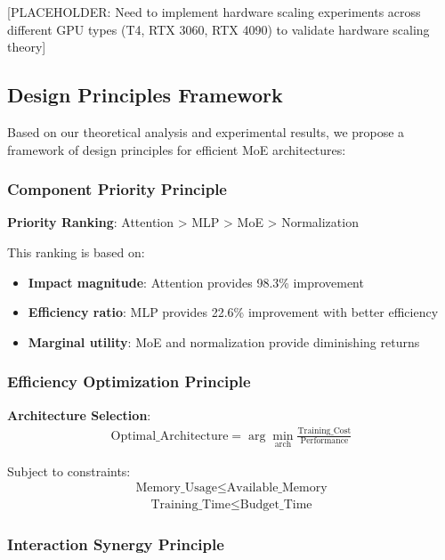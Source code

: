 \documentclass[11pt,a4paper]{article}
\begin{document}
[PLACEHOLDER: Need to implement hardware scaling experiments across different GPU types (T4, RTX 3060, RTX 4090) to validate hardware scaling theory]

\subsection{Design Principles Framework}

Based on our theoretical analysis and experimental results, we propose a framework of design principles for efficient MoE architectures:

\subsubsection{Component Priority Principle}

\textbf{Priority Ranking}: Attention > MLP > MoE > Normalization

This ranking is based on:
\begin{itemize}
    \item \textbf{Impact magnitude}: Attention provides 98.3\% improvement
    \item \textbf{Efficiency ratio}: MLP provides 22.6\% improvement with better efficiency
    \item \textbf{Marginal utility}: MoE and normalization provide diminishing returns
\end{itemize}

\subsubsection{Efficiency Optimization Principle}

\textbf{Architecture Selection}:
\begin{align}
\text{Optimal\_Architecture} = \arg\min_{\text{arch}} \frac{\text{Training\_Cost}}{\text{Performance}}
\end{align}

Subject to constraints:
\begin{align}
\text{Memory\_Usage} \leq \text{Available\_Memory}
\end{align}
\begin{align}
\text{Training\_Time} \leq \text{Budget\_Time}
\end{align}

\subsubsection{Interaction Synergy Principle}
\end{document}
